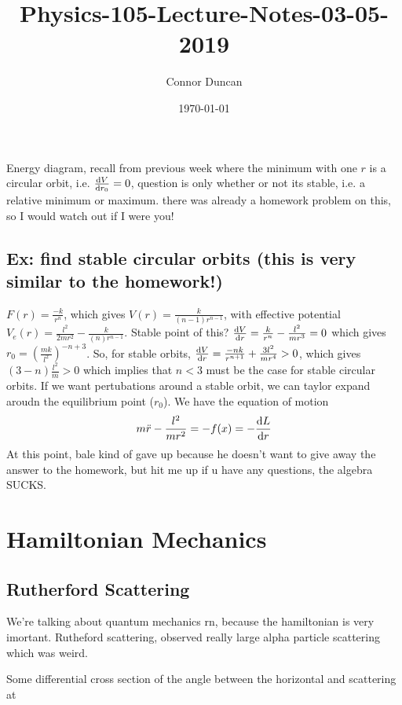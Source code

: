 \documentclass{article} \usepackage{amsmath} \usepackage{amssymb} \usepackage{amsthm} \usepackage[margin=0.2in]{geometry} \usepackage{hyperref} \usepackage{physics} \usepackage{tikz} \usepackage{mathtools} \mathtoolsset{showonlyrefs} \theoremstyle{definition} \newtheorem{theorem}{Theorem}[section] \newtheorem{corollary}{Corollary}[theorem] \newtheorem{lemma}[theorem]{Lemma} \newtheorem{definition}{Definition}[section] \author{Connor Duncan} \date{\today}
\title{Physics-105-Lecture-Notes-03-05-2019}
\begin{document}
\maketitle\tableofcontents
\noindent{}
Energy diagram, recall from previous week where the minimum with one $r$ is a circular orbit, i.e. $\dv{V}{r_0}=0$, question is only whether or not its stable, i.e. a relative minimum or maximum. there was already a homework problem on this, so I would watch out if I were you! \subsection{Ex: find stable circular orbits (this is very similar to the homework!)} $F(r)=\frac{-k}{r^n}$, which gives $V(r)=\frac{k}{(n-1)r^{n-1}}$, with effective potential $V_e(r)=\frac{l^2}{2mr^2}-\frac{k}{(n)r^{n-1}}$. Stable point of this? $\dv{V}{r}=\frac{k}{r^n}-\frac{l^2}{mr^3}=0$ which gives $r_0=\left(\frac{mk}{l^2}\right)^{-n+3}$. So, for stable orbits, $\dv{V}{r}=\frac{-nk}{r^{n+1}}+\frac{3l^2}{mr^4}>0$, which gives $(3-n)\frac{l^2}{m}>0$ which implies that $n<3$ must be the case for stable circular orbits. If we want pertubations around a stable orbit, we can taylor expand aroudn the equilibrium point ($r_0$). We have the equation of motion \begin{equation} m\ddot r-\frac{l^2}{mr^2}=-f(x)=-\dv{L}{r} \end{equation} At this point, bale kind of gave up because he doesn't want to give away the answer to the homework, but hit me up if u have any questions, the algebra SUCKS. \section{Hamiltonian Mechanics} \subsection{Rutherford Scattering} We're talking about quantum mechanics rn, because the hamiltonian is very imortant. Rutheford scattering, observed really large alpha particle scattering which was weird. \begin{center}  \end{center} Some differential cross section of the angle between the horizontal and scattering at 
\end{document}
